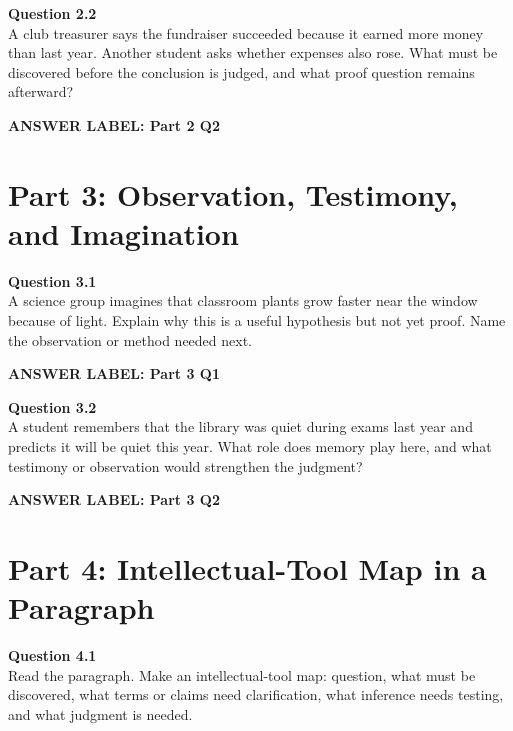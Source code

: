 \documentclass[12pt]{article}
\newcommand{\answerbox}[2]{%
\vspace{0.15em}
\noindent\textbf{#1}\par
\vspace{0.05em}
\noindent\fbox{%
\begin{minipage}[t][#2]{\dimexpr\textwidth-2\fboxsep-2\fboxrule}
\rule{\textwidth}{0pt}
\vspace{#2}
\end{minipage}
}\par
\vspace{0.25em}
}
\begin{document}
\textbf{Question 2.2}\\[-0.15em]
A club treasurer says the fundraiser succeeded because it earned more money than last year. Another student asks whether expenses also rose. What must be discovered before the conclusion is judged, and what proof question remains afterward?

\answerbox{ANSWER LABEL: Part 2 Q2}{2.45in}

\newpage

\section*{Part 3: Observation, Testimony, and Imagination}

\textbf{Question 3.1}\\[-0.15em]
A science group imagines that classroom plants grow faster near the window because of light. Explain why this is a useful hypothesis but not yet proof. Name the observation or method needed next.

\answerbox{ANSWER LABEL: Part 3 Q1}{2.55in}

\textbf{Question 3.2}\\[-0.15em]
A student remembers that the library was quiet during exams last year and predicts it will be quiet this year. What role does memory play here, and what testimony or observation would strengthen the judgment?

\answerbox{ANSWER LABEL: Part 3 Q2}{2.55in}

\newpage

\section*{Part 4: Intellectual-Tool Map in a Paragraph}

\textbf{Question 4.1}\\[-0.15em]
Read the paragraph. Make an intellectual-tool map: question, what must be discovered, what terms or claims need clarification, what inference needs testing, and what judgment is needed.

\vspace{0.2em}

\noindent{}
\end{document}

